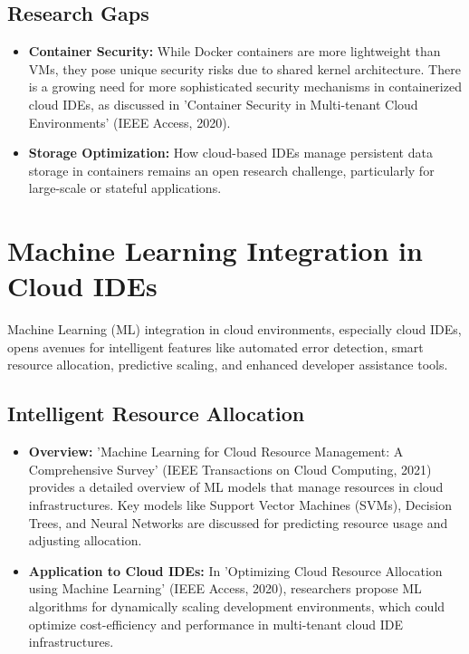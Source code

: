 \documentclass[12pt,a4paper,final]{report}
\begin{document}
\subsection{Research Gaps}
\begin{itemize}
    \item \textbf{Container Security:} While Docker containers are more lightweight than VMs, they pose unique security risks due to shared kernel architecture. There is a growing need for more sophisticated security mechanisms in containerized cloud IDEs, as discussed in 'Container Security in Multi-tenant Cloud Environments' (IEEE Access, 2020).
    \item \textbf{Storage Optimization:} How cloud-based IDEs manage persistent data storage in containers remains an open research challenge, particularly for large-scale or stateful applications.
\end{itemize}

\section{Machine Learning Integration in Cloud IDEs}

Machine Learning (ML) integration in cloud environments, especially cloud IDEs, opens avenues for intelligent features like automated error detection, smart resource allocation, predictive scaling, and enhanced developer assistance tools.

\subsection{Intelligent Resource Allocation}
\begin{itemize}
    \item \textbf{Overview:} 'Machine Learning for Cloud Resource Management: A Comprehensive Survey' (IEEE Transactions on Cloud Computing, 2021) provides a detailed overview of ML models that manage resources in cloud infrastructures. Key models like Support Vector Machines (SVMs), Decision Trees, and Neural Networks are discussed for predicting resource usage and adjusting allocation.
    \item \textbf{Application to Cloud IDEs:} In 'Optimizing Cloud Resource Allocation using Machine Learning' (IEEE Access, 2020), researchers propose ML algorithms for dynamically scaling development environments, which could optimize cost-efficiency and performance in multi-tenant cloud IDE infrastructures.
\end{itemize}
\end{document}
